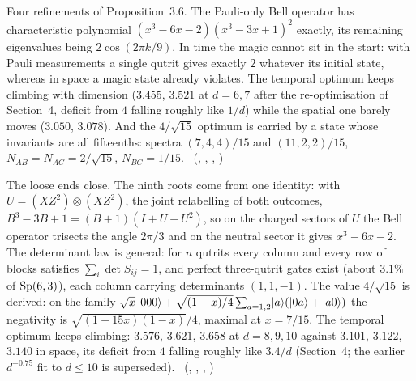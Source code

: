 Four refinements of Proposition~3.6. The Pauli-only Bell operator has characteristic polynomial
$(x^3-6x-2)(x^3-3x+1)^2$ exactly, its remaining eigenvalues being $2\cos(2\pi k/9)$. In time the magic cannot sit in the
start: with Pauli measurements a single qutrit gives exactly $2$ whatever its initial state, whereas in space a magic
state already violates. The temporal optimum keeps climbing with dimension ($3.455$, $3.521$ at $d=6,7$ after the re-optimisation of Section~4, deficit from $4$
falling roughly like $1/d$) while the spatial one barely moves ($3.050$, $3.078$). And the $4/\sqrt{15}$ optimum is carried
by a state whose invariants are all fifteenths: spectra $(7,4,4)/15$ and $(11,2,2)/15$, $N_{AB}=N_{AC}=2/\sqrt{15}$,
$N_{BC}=1/15$. \tierC\ (, ,
, )

The loose ends close. The ninth roots come from one identity: with $U=(XZ^2)\otimes(XZ^2)$, the joint relabelling of both
outcomes, $B^3-3B+1=(B+1)(I+U+U^2)$, so on the charged sectors of $U$ the Bell operator trisects the angle $2\pi/3$ and on
the neutral sector it gives $x^3-6x-2$. The determinant law is general: for $n$ qutrits every column and every row of
blocks satisfies $\sum_i\det S_{ij}=1$, and perfect three-qutrit gates exist (about $3.1\%$ of $\mathrm{Sp}(6,3)$), each column
carrying determinants $(1,1,-1)$. The value $4/\sqrt{15}$ is derived: on the family
$\sqrt x\,\lvert 000\rangle+\sqrt{(1-x)/4}\sum_{a=1,2}\lvert a\rangle(\lvert 0a\rangle+\lvert a0\rangle)$ the negativity is $\sqrt{(1+15x)(1-x)}/4$, maximal
at $x=7/15$. The temporal optimum keeps climbing: $3.576$, $3.621$, $3.658$ at $d=8,9,10$ against $3.101$, $3.122$, $3.140$ in space, its deficit from $4$ falling roughly like $3.4/d$ (Section~4; the earlier $d^{-0.75}$ fit to $d\le10$ is superseded). \tierC\ (,
, ,
)

